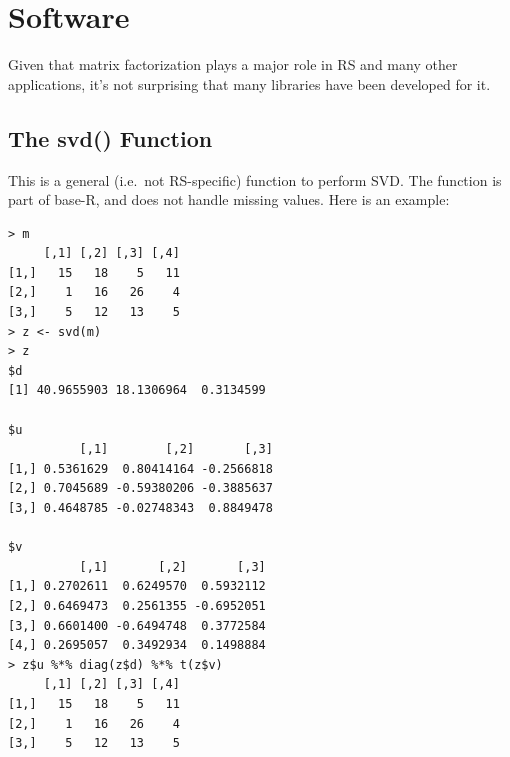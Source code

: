 \section{Software}

Given that matrix factorization plays a major role in RS and many other
applications, it's not surprising that many libraries have been
developed for it.

\subsection{The svd() Function}

This is a general (i.e.\ not RS-specific) function to perform SVD.  The
function is part of base-R, and does not handle missing values.
Here is an example:

\begin{lstlisting}
> m
     [,1] [,2] [,3] [,4]
[1,]   15   18    5   11
[2,]    1   16   26    4
[3,]    5   12   13    5
> z <- svd(m)
> z
$d
[1] 40.9655903 18.1306964  0.3134599

$u
          [,1]        [,2]       [,3]
[1,] 0.5361629  0.80414164 -0.2566818
[2,] 0.7045689 -0.59380206 -0.3885637
[3,] 0.4648785 -0.02748343  0.8849478

$v
          [,1]       [,2]       [,3]
[1,] 0.2702611  0.6249570  0.5932112
[2,] 0.6469473  0.2561355 -0.6952051
[3,] 0.6601400 -0.6494748  0.3772584
[4,] 0.2695057  0.3492934  0.1498884
> z$u %*% diag(z$d) %*% t(z$v) 
     [,1] [,2] [,3] [,4]
[1,]   15   18    5   11
[2,]    1   16   26    4
[3,]    5   12   13    5
\end{lstlisting}

% 
% 
% 
% 


